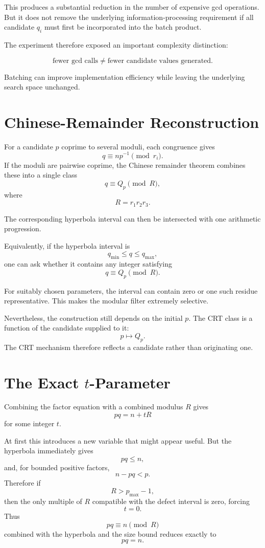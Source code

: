 \documentclass[11pt,a4paper]{article}
\begin{document}
This produces a substantial reduction in the number of expensive gcd operations. But it does not remove the underlying information-processing requirement if all candidate $q_i$ must first be incorporated into the batch product.

The experiment therefore exposed an important complexity distinction:

\[
\boxed{\text{fewer gcd calls} \neq \text{fewer candidate values generated}.}
\]

Batching can improve implementation efficiency while leaving the underlying search space unchanged.

\section{Chinese-Remainder Reconstruction}

For a candidate $p$ coprime to several moduli, each congruence gives
\[
    q\equiv np^{-1}\pmod{r_i}.
\]
If the moduli are pairwise coprime, the Chinese remainder theorem combines these into a single class
\[
    q\equiv Q_p\pmod R,
\]
where
\[
    R=r_1r_2r_3.
\]

The corresponding hyperbola interval can then be intersected with one arithmetic progression.

Equivalently, if the hyperbola interval is
\[
    q_{\min}\leq q\leq q_{\max},
\]
one can ask whether it contains any integer satisfying
\[
    q\equiv Q_p\pmod R.
\]

For suitably chosen parameters, the interval can contain zero or one such residue representative. This makes the modular filter extremely selective.

Nevertheless, the construction still depends on the initial $p$. The CRT class is a function of the candidate supplied to it:
\[
    p\longmapsto Q_p.
\]
The CRT mechanism therefore reflects a candidate rather than originating one.

\section{The Exact $t$-Parameter}

Combining the factor equation with a combined modulus $R$ gives
\[
    pq=n+tR
\]
for some integer $t$.

At first this introduces a new variable that might appear useful. But the hyperbola immediately gives
\[
    pq\leq n,
\]
and, for bounded positive factors,
\[
    n-pq<p.
\]
Therefore if
\[
    R>p_{\max}-1,
\]
then the only multiple of $R$ compatible with the defect interval is zero, forcing
\[
    t=0.
\]
Thus
\[
    pq\equiv n\pmod R
\]
combined with the hyperbola and the size bound reduces exactly to
\[
    pq=n.
\]
\end{document}
